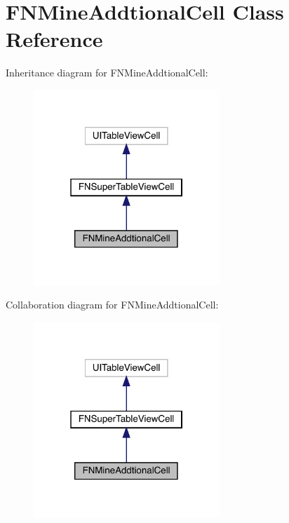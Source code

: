 \hypertarget{interface_f_n_mine_addtional_cell}{}\section{F\+N\+Mine\+Addtional\+Cell Class Reference}
\label{interface_f_n_mine_addtional_cell}


Inheritance diagram for F\+N\+Mine\+Addtional\+Cell\+:\nopagebreak
\begin{figure}[H]
\begin{center}
\leavevmode
\includegraphics[width=199pt]{interface_f_n_mine_addtional_cell__inherit__graph}
\end{center}
\end{figure}


Collaboration diagram for F\+N\+Mine\+Addtional\+Cell\+:\nopagebreak
\begin{figure}[H]
\begin{center}
\leavevmode
\includegraphics[width=199pt]{interface_f_n_mine_addtional_cell__coll__graph}
\end{center}
\end{figure}
